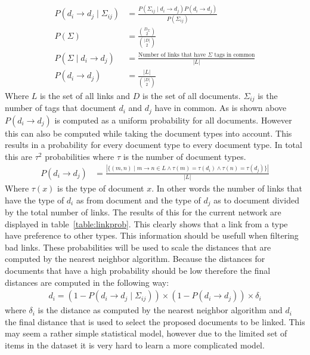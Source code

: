 \begin{align}
  P(d_i \to d_j \mid \Sigma_{ij}) &= \frac{P(\Sigma_{ij} \mid d_i \to d_j)P(d_i \to d_j)}{P(\Sigma_{ij})} \\
  P(\Sigma) &= \frac{{D_\Sigma \choose 2}}{{|D| \choose 2}} \\ 
  P(\Sigma \mid d_i \to d_j) &= \frac{\textrm{Number of links that have $\Sigma$ tags in common}}{|L|} \\
  P(d_i \to d_j) &= \frac{|L|}{{|D| \choose 2}}
\end{align}
Where $L$ is the set of all links and $D$ is the set of all documents.
$\Sigma_{ij}$ is the number of tags that document $d_i$ and $d_j$ have in
common. As is shown above $P(d_i \to d_j)$ is computed as a uniform probability
for all documents. However this can also be computed while taking the document
types into account. This results in a probability for every document type
to every document type. In total this are $\tau^2$ probabilities where $\tau$
is the number of document types.
\begin{align}
  P(d_i \to d_j) &= \frac{|\{(m, n) \mid m \to n \in L \land \tau(m) = \tau(d_i) \land \tau(n) = \tau(d_j)\}|}{|L|} \label{eq:linkprob}
\end{align}
Where $\tau(x)$ is the type of document $x$. In other words the number of links
that have the type of $d_i$ as from document and the type of $d_j$ as to
document divided by the total number of links. The results of this for the
current network are displayed in table~\ref{table:linkprob}. This clearly shows
that a link from a type have preference to other types. This information should
be usefull when filtering bad links. These probabilities will be used to scale
the distances that are computed by the nearest neighbor algorithm. Because the
distances for documents that have a high probability should be low therefore
the final distances are computed in the following way:
\begin{align}
  d_i = (1 - P(d_i\to d_j \mid \Sigma_{ij})) \times (1-P(d_i \to d_j)) \times \delta_i 
\end{align}
where $\delta_i$ is the distance as computed by the nearest neighbor algorithm
and $d_i$ the final distance that is used to select the proposed documents to
be linked. This may seem a rather simple statistical model, however due to the
limited set of items in the dataset it is very hard to learn a more complicated
model.


